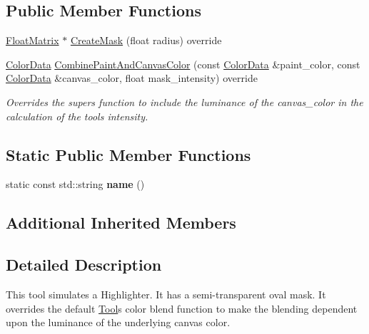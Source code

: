 \subsection*{Public Member Functions}
\begin{DoxyCompactItemize}
\item 
\hyperlink{classimage__tools_1_1FloatMatrix}{Float\+Matrix} $\ast$ \hyperlink{classimage__tools_1_1ToolHighlighter_a8c5c4f6c91fc49a89c1d24bdc2b3ea70}{Create\+Mask} (float radius) override
\item 
\mbox{\label{classimage__tools_1_1ToolHighlighter_a8f4f3c016d4965edd02ad8e8559af4d1}} 
\hyperlink{classimage__tools_1_1ColorData}{Color\+Data} \hyperlink{classimage__tools_1_1ToolHighlighter_a8f4f3c016d4965edd02ad8e8559af4d1}{Combine\+Paint\+And\+Canvas\+Color} (const \hyperlink{classimage__tools_1_1ColorData}{Color\+Data} \&paint\+\_\+color, const \hyperlink{classimage__tools_1_1ColorData}{Color\+Data} \&canvas\+\_\+color, float mask\+\_\+intensity) override
\begin{DoxyCompactList}\small\item\em Overrides the super\textquotesingle{}s function to include the luminance of the canvas\+\_\+color in the calculation of the tool\textquotesingle{}s intensity. \end{DoxyCompactList}\end{DoxyCompactItemize}
\subsection*{Static Public Member Functions}
\begin{DoxyCompactItemize}
\item 
\mbox{\label{classimage__tools_1_1ToolHighlighter_ae55632ec3524f34bc7c0c3238d03b6c0}} 
static const std\+::string {\bfseries name} ()
\end{DoxyCompactItemize}
\subsection*{Additional Inherited Members}


\subsection{Detailed Description}
This tool simulates a Highlighter. It has a semi-\/transparent oval mask. It overrides the default \hyperlink{classimage__tools_1_1Tool}{Tool}\textquotesingle{}s color blend function to make the blending dependent upon the luminance of the underlying canvas color. 

